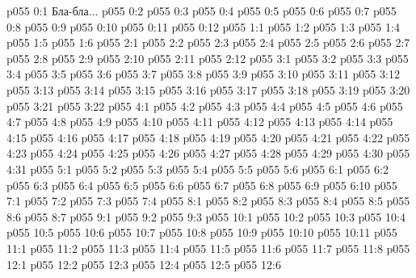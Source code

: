 \author{Могущественный Посланник}
\vs p055 0:1  Бла-бла...
\vs p055 0:2 
\vs p055 0:3 \pc 
\vs p055 0:4 \pc 
\vs p055 0:5 
\vs p055 0:6 
\vs p055 0:7 
\vs p055 0:8 
\vs p055 0:9 
\vs p055 0:10 
\vs p055 0:11 
\vs p055 0:12 \pc 
{}
\vs p055 1:1 
\vs p055 1:2 
\vs p055 1:3 \pc 
\vs p055 1:4 \pc 
\vs p055 1:5 
\vs p055 1:6 \pc 
{}
\vs p055 2:1 
\vs p055 2:2 
\vs p055 2:3 \pc 
\vs p055 2:4 \pc 
\vs p055 2:5 
\vs p055 2:6 
\vs p055 2:7 \pc 
\vs p055 2:8 
\vs p055 2:9 \pc 
\vs p055 2:10 
\vs p055 2:11 
\vs p055 2:12 
\vs p055 3:1 
\vs p055 3:2 \pc 
\vs p055 3:3 
\vs p055 3:4 
\vs p055 3:5 
\vs p055 3:6 
\vs p055 3:7 \pc 
\vs p055 3:8 
\vs p055 3:9 
\vs p055 3:10 \pc 
\vs p055 3:11 
\vs p055 3:12 
\vs p055 3:13 \pc 
\vs p055 3:14 
\vs p055 3:15 
\vs p055 3:16 
\vs p055 3:17 
\vs p055 3:18 
\vs p055 3:19 
\vs p055 3:20 
\vs p055 3:21 \pc 
\vs p055 3:22 
\vs p055 4:1 
\vs p055 4:2 
\vs p055 4:3 
\vs p055 4:4 
\vs p055 4:5 
\vs p055 4:6 
\vs p055 4:7 
\vs p055 4:8 \pc 
\vs p055 4:9 
\vs p055 4:10 
\vs p055 4:11 
\vs p055 4:12 
\vs p055 4:13 
\vs p055 4:14 
\vs p055 4:15 
\vs p055 4:16 
\vs p055 4:17 
\vs p055 4:18 
\vs p055 4:19 
\vs p055 4:20 
\vs p055 4:21 
\vs p055 4:22 
\vs p055 4:23 
\vs p055 4:24 \pc 
\vs p055 4:25 
\vs p055 4:26 
\vs p055 4:27 
\vs p055 4:28 
\vs p055 4:29 
\vs p055 4:30 \pc 
\vs p055 4:31 
\vs p055 5:1 
\vs p055 5:2 
\vs p055 5:3 
\vs p055 5:4 
\vs p055 5:5 
\vs p055 5:6 
\vs p055 6:1 
\vs p055 6:2 
\vs p055 6:3 
\vs p055 6:4 \pc 
\vs p055 6:5 
\vs p055 6:6 
\vs p055 6:7 \pc 
\vs p055 6:8 
\vs p055 6:9 
\vs p055 6:10 
\vs p055 7:1 
\vs p055 7:2 
\vs p055 7:3 
\vs p055 7:4 \pc 
{}
\vs p055 8:1 
\vs p055 8:2 
\vs p055 8:3 
\vs p055 8:4 
\vs p055 8:5 \pc 
\vs p055 8:6 
\vs p055 8:7 \pc 
{}
\vs p055 9:1 
\vs p055 9:2 
\vs p055 9:3 
\vs p055 10:1 
\vs p055 10:2 
\vs p055 10:3 \pc 
\vs p055 10:4 \pc 
\vs p055 10:5 
\vs p055 10:6 
\vs p055 10:7 \pc 
\vs p055 10:8 
\vs p055 10:9 \pc 
\vs p055 10:10 
\vs p055 10:11 
\vs p055 11:1 
\vs p055 11:2 \pc 
\vs p055 11:3 \pc 
\vs p055 11:4 
\vs p055 11:5 \pc 
\vs p055 11:6 
\vs p055 11:7 
\vs p055 11:8 
\vs p055 12:1 
\vs p055 12:2 
\vs p055 12:3 \pc 
\vs p055 12:4 
\vs p055 12:5 \pc 
\vsetoff
\vs p055 12:6 
\quizlink
